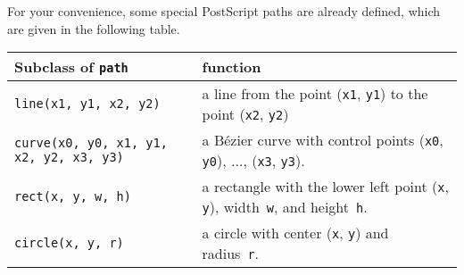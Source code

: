 For your convenience, some special PostScript paths are already defined, which
are given in the following table.

\medskip
\begin{tabularx}{\linewidth}{l>{\raggedright\arraybackslash}X}
Subclass of \texttt{path} & function \\
\hline
\texttt{line(x1, y1, x2, y2)} & a line from the point
  (\texttt{x1}, \texttt{y1}) to the point (\texttt{x2}, \texttt{y2})\\
\texttt{curve(x0, y0, x1, y1, x2, y2, x3, y3)} & a B\'ezier curve with 
control points  (\texttt{x0}, \texttt{y0}), $\dots$, (\texttt{x3}, \texttt{y3}).\\
\texttt{rect(x, y, w, h)} &  a rectangle with the
  lower left point (\texttt{x}, \texttt{y}), width~\texttt{w}, and
  height~\texttt{h}. \\
\texttt{circle(x, y, r)} & a circle with 
  center (\texttt{x}, \texttt{y}) and radius~\texttt{r}.
\end{tabularx}
\medskip






